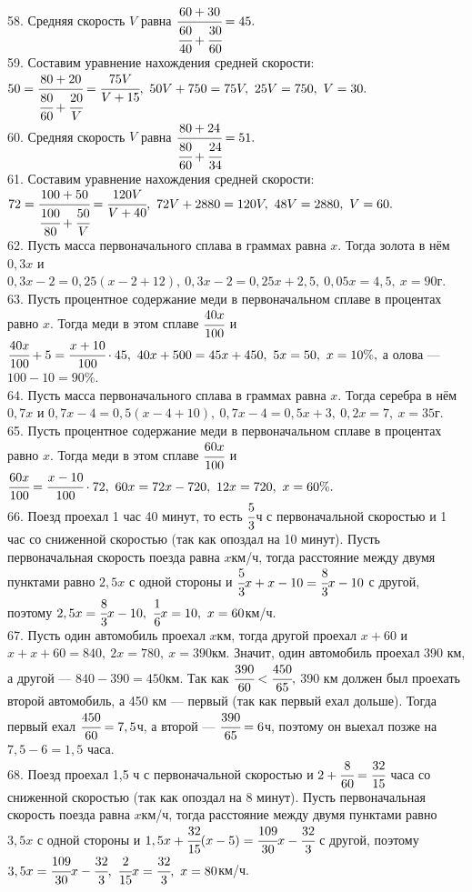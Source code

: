 \documentclass[12pt]{article}
\begin{document}
58. Средняя скорость $V$ равна $\cfrac{60+30}{\cfrac{60}{40}+\cfrac{30}{60}}=45.$\\
59. Составим уравнение нахождения средней скорости: $50=\cfrac{80+20}{\cfrac{80}{60}+\cfrac{20}{V}}=\cfrac{75V}{V+15},\ 50V+750=75V,\ 25V=750,\ V=30.$\\
60. Средняя скорость $V$ равна $\cfrac{80+24}{\cfrac{80}{60}+\cfrac{24}{34}}=51.$\\
61. Составим уравнение нахождения средней скорости: $72=\cfrac{100+50}{\cfrac{100}{80}+\cfrac{50}{V}}=\cfrac{120V}{V+40},\ 72V+2880=120V,\ 48V=2880,\ V=60.$\\
62. Пусть масса первоначального сплава в граммах равна $x.$ Тогда золота в нём $0,3x$ и $0,3x-2=0,25(x-2+12),\ 0,3x-2=0,25x+2,5,\ 0,05x=4,5,\ x=90$г.\\
63. Пусть процентное содержание меди в первоначальном сплаве в процентах равно $x.$ Тогда меди в этом сплаве $\cfrac{40x}{100}$ и $\cfrac{40x}{100}+5=\cfrac{x+10}{100}\cdot45,\ 40x+500=45x+450,\ 5x=50,\ x=10\%,$ а олова --- $100-10=90\%.$\\
64. Пусть масса первоначального сплава в граммах равна $x.$ Тогда серебра в нём $0,7x$ и $0,7x-4=0,5(x-4+10),\ 0,7x-4=0,5x+3,\ 0,2x=7,\ x=35$г.\\
65. Пусть процентное содержание меди в первоначальном сплаве в процентах равно $x.$ Тогда меди в этом сплаве $\cfrac{60x}{100}$ и $\cfrac{60x}{100}=\cfrac{x-10}{100}\cdot72,\ 60x=72x-720,\ 12x=720,\ x=60\%.$\\
66. Поезд проехал 1 час 40 минут, то есть $\cfrac{5}{3}$ч с первоначальной скоростью и 1 час со сниженной скоростью (так как опоздал на 10 минут). Пусть первоначальная скорость поезда равна $x$км/ч, тогда расстояние между двумя пунктами равно $2,5x$ с одной стороны и  $\cfrac{5}{3}x+x-10=\cfrac{8}{3}x-10$ с другой, поэтому $2,5x=\cfrac{8}{3}x-10,\ \cfrac{1}{6}x=10,\ x=60$км/ч.\\
67. Пусть один автомобиль проехал $x$км, тогда другой проехал $x+60$ и $x+x+60=840,\ 2x=780,\ x=390$км. Значит, один автомобиль проехал 390 км, а другой --- $840-390=450$км. Так как $\cfrac{390}{60}<\cfrac{450}{65},$ 390 км должен был проехать второй автомобиль, а 450 км --- первый (так как первый ехал дольше). Тогда первый ехал $\cfrac{450}{60}=7,5$ч, а второй --- $\cfrac{390}{65}=6$ч, поэтому он выехал позже на $7,5-6=1,5$ часа.\\
68. Поезд проехал 1,5 ч с первоначальной скоростью и $2+\cfrac{8}{60}=\cfrac{32}{15}$ часа со сниженной скоростью (так как опоздал на 8 минут). Пусть первоначальная скорость поезда равна $x$км/ч, тогда расстояние между двумя пунктами равно $3,5x$ с одной стороны и  $1,5x+\cfrac{32}{15}(x-5)=\cfrac{109}{30}x-\cfrac{32}{3}$ с другой, поэтому $3,5x=\cfrac{109}{30}x-\cfrac{32}{3},\ \cfrac{2}{15}x=\cfrac{32}{3},\ x=80$км/ч.\\
\end{document}
